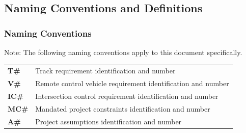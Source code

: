 \documentclass [11pt]{article}
\begin{document}
\subsection{Naming Conventions and Definitions}
\subsubsection{Naming Conventions}
Note: The following naming conventions apply to this document specifically. 
\begin{longtable}{ |p{ }  p{ }|}  \hline
\textbf{T\#} &  Track requirement identification  and number \\ 

\cellcolor{tableCell}\textbf{V\#}  & \cellcolor{tableCell}Remote control vehicle requirement identification  and number \\ 

\textbf{IC\#} & Intersection control requirement identification  and number \\ 

\cellcolor{tableCell}\textbf{MC\#} &  \cellcolor{tableCell}Mandated project constraints identification and number \\ 



\textbf{A\#} & Project assumptions identification and number \\ \hline

\end{longtable}
%
\end{document}
